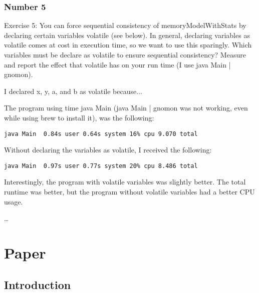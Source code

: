 \documentclass{article}
\theoremstyle{theorem}
\theoremstyle{definition}
\theoremstyle{remark}
\begin{document}
\subsubsection{Number 5}
\noindent\newline Exercise 5: You can force sequential consistency of memoryModelWithStats by declaring certain variables volatile (see below). In general, declaring variables as volatile comes at cost in execution time, so we want to use this sparingly. Which variables must be declare as volatile to ensure sequential consistency? Measure and report the effect that volatile has on your run time (I use java Main | gnomon).

\noindent\newline I declared x, y, a, and b as volatile because...

\noindent\newline The program using time java Main (java Main | gnomon was not working, even while using brew to install it), was the following:
\begin{verbatim}
java Main  0.84s user 0.64s system 16% cpu 9.070 total
\end{verbatim}

\noindent\newline Without declaring the variables as volatile, I received the following:
\begin{verbatim}
java Main  0.97s user 0.77s system 20% cpu 8.486 total
\end{verbatim}

\noindent\newline\newline Interestingly, the program with volatile variables was slightly better. The total runtime was better, but the program without volatile variables had a better CPU usage.


\dots

\section{Paper}
\subsection{Introduction}
\end{document}
